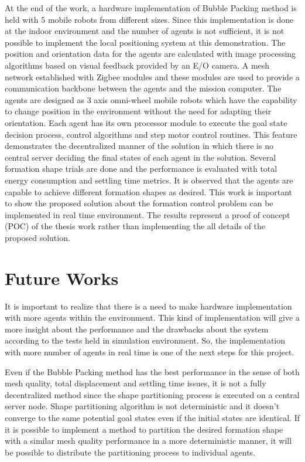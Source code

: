 At the end of the work, a hardware implementation of Bubble Packing method is held with 5 mobile robots from different sizes. Since this implementation is done at the  indoor environment and the number of agents is not sufficient, it is not possible to implement the local positioning system at this demonstration. The position and orientation data for the agents are calculated with image processing algorithms based on visual feedback provided by an E/O camera. A mesh network established with Zigbee modules and these modules are used to provide a communication backbone between the agents and the mission computer. The agents are designed as 3 axis omni-wheel mobile robots which have the capability to change position in the environment without the need for adapting their orientation. Each agent has its own processor module to execute the goal state decision process, control algorithms and step motor control routines. This feature demonstrates the decentralized manner of the solution in which  there is no central server deciding the final states of each agent in the solution. Several formation shape trials are done and the performance is evaluated with total energy consumption and settling time metrics. It is observed that the agents are capable to achieve different formation shapes as desired. This work is important to show the proposed solution about the formation control problem can be implemented in real time environment. The results represent a proof of concept (POC) of the thesis work rather than implementing the all details of the proposed solution.
       
\section{Future Works}
It is important to realize that there is a need to make hardware implementation with more agents within the environment. This kind of  implementation will give a more insight about the performance and the drawbacks about the system according to the tests held in simulation environment. So, the implementation with more number of agents in real time is one of the next steps for this project.
		
Even if the Bubble Packing method has the best performance in the sense of both mesh quality, total displacement and settling time issues, it is not a fully decentralized method since the shape partitioning process is executed on a central server node. Shape partitioning algorithm is not deterministic and it doesn't converge to the same potential goal states even if the initial states are identical. If it is possible to implement a method to partition the desired formation shape with a similar mesh quality performance in a more deterministic manner, it will be possible to distribute the partitioning process to individual agents. 
    
